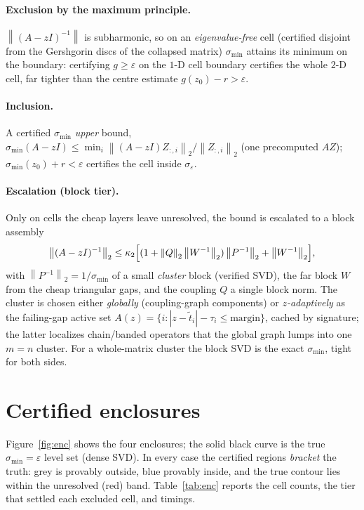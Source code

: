 \documentclass[11pt,a4paper]{article}
\newcommand{\smin}{\sigma_{\min}}
\newcommand{\eps}{\varepsilon}
\newcommand{\norm}[1]{\left\|#1\right\|}
\begin{document}
\paragraph{Exclusion by the maximum principle.} $\norm{(A-zI)^{-1}}$ is
subharmonic, so on an \emph{eigenvalue-free} cell (certified disjoint from the
Gershgorin discs of the collapsed matrix) $\smin$ attains its minimum on the
boundary: certifying $g\ge\eps$ on the $1$-D cell boundary certifies the whole
$2$-D cell, far tighter than the centre estimate $g(z_0)-r>\eps$.

\paragraph{Inclusion.} A certified $\smin$ \emph{upper} bound,
$\smin(A-zI)\le\min_i\norm{(A-zI)Z_{:,i}}_2/\norm{Z_{:,i}}_2$ (one precomputed
$AZ$); $\smin(z_0)+r<\eps$ certifies the cell inside $\sigma_\eps$.

\paragraph{Escalation (block tier).} Only on cells the cheap layers leave
unresolved, the bound is escalated to a block assembly
\[
  \norm{(A-zI)^{-1}}_2 \le \kappa_2\Bigl[(1+\norm{Q}_2\norm{W^{-1}}_2)\norm{P^{-1}}_2+\norm{W^{-1}}_2\Bigr],
\]
with $\norm{P^{-1}}_2=1/\smin$ of a small \emph{cluster} block (verified SVD), the
far block $W$ from the cheap triangular gaps, and the coupling $Q$ a single block
norm. The cluster is chosen either \emph{globally} (coupling-graph components) or
\emph{$z$-adaptively} as the failing-gap active set $A(z)=\{i:|z-\tilde
t_i|-\tau_i\le\text{margin}\}$, cached by signature; the latter localizes
chain/banded operators that the global graph lumps into one $m=n$ cluster. For a
whole-matrix cluster the block SVD is the exact $\smin$, tight for both sides.

\section{Certified enclosures}

Figure~\ref{fig:enc} shows the four enclosures; the solid black curve is the true
$\smin=\eps$ level set (dense SVD). In every case the certified regions
\emph{bracket} the truth: grey is provably outside, blue provably inside, and the
true contour lies within the unresolved (red) band. Table~\ref{tab:enc} reports
the cell counts, the tier that settled each excluded cell, and timings.
\end{document}
